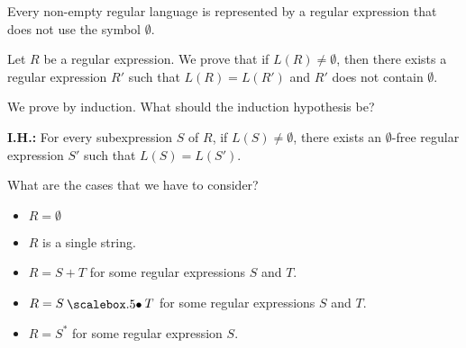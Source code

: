 \begin{frame}
  \begin{lemma}
    Every non-empty regular language is represented by a regular
    expression that does not use the symbol $\emptyset$.
  \end{lemma}

  \pause

  Let $R$ be a regular expression. \pause We prove that if
  $L(R)\neq\emptyset$, then there exists a regular expression $R'$
  such that $L(R)=L(R')$ and $R'$ does not contain $\emptyset$.

  \pause We prove by induction.  What should the induction hypothesis
  be?

  \vspace{1.5in}
\end{frame}

\begin{frame}

  {\bf I.H.:} For every subexpression $S$ of $R$, if $L(S)\neq
  \emptyset$, there exists an $\emptyset$-free regular expression $S'$
  such that $L(S)=L(S')$.

  \vspace{0.1in}
  
  \pause

  \begin{block}{What are the cases that we have to consider?}

  \pause

  \begin{itemize}
  \item $R=\emptyset$
  \item $R$ is a single string.
  \item $R = S+T$ for some regular expressions $S$ and $T$.
  \item $R = S\sbullet T$ for some regular expressions $S$ and $T$.
  \item $R = S^*$ for some regular expression $S$.
  \end{itemize}
  \end{block}
  
\end{frame}

